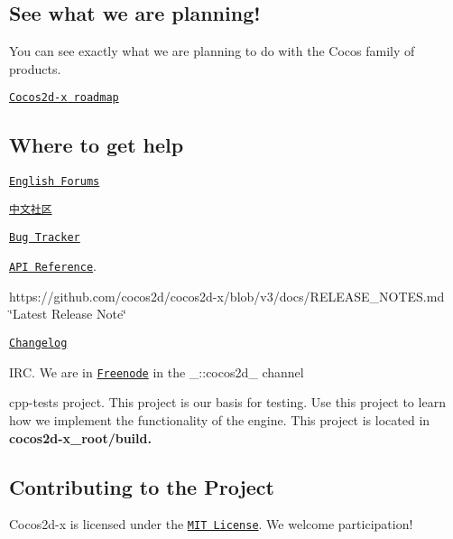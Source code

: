 \subsection*{See what we are planning! }

You can see exactly what we are planning to do with the Cocos family of products.


\begin{DoxyItemize}
\item \href{https://trello.com/b/Np6obnuE/cocos2d-x-roadmap}{\tt Cocos2d-\/x roadmap}
\end{DoxyItemize}

\subsection*{Where to get help }


\begin{DoxyItemize}
\item \href{http://discuss.cocos2d-x.org}{\tt English Forums}
\item \href{http://forum.cocos.com/c/cocos2d-x}{\tt 中文社区}
\item \href{https://github.com/cocos2d/cocos2d-x/issues}{\tt Bug Tracker}
\item \href{http://cocos2d-x.org/docs/api-ref/index.html}{\tt A\+PI Reference}.
\item https\+://github.com/cocos2d/cocos2d-\/x/blob/v3/docs/\+R\+E\+L\+E\+A\+S\+E\+\_\+\+N\+O\+T\+E\+S.\+md \char`\"{}\+Latest Release Note\char`\"{}
\item \href{https://github.com/cocos2d/cocos2d-x/blob/v3/CHANGELOG}{\tt Changelog}
\item I\+RC. We are in \href{https://webchat.freenode.net/}{\tt Freenode} in the \+\_\+\+::cocos2d\+\_\+ channel
\item {\ttfamily cpp-\/tests} project. This project is our basis for testing. Use this project to learn how we implement the functionality of the engine. This project is located in {\bfseries cocos2d-\/x\+\_\+root/build.}
\end{DoxyItemize}

\subsection*{Contributing to the Project }

Cocos2d-\/x is licensed under the \href{https://opensource.org/licenses/MIT}{\tt M\+IT License}. We welcome participation!

